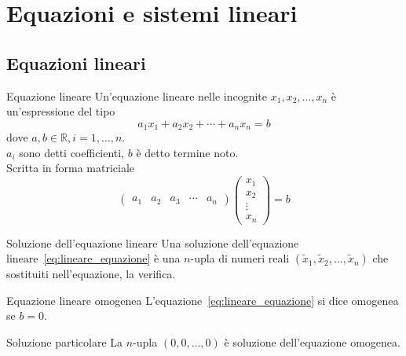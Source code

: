 
\section{Equazioni e sistemi lineari}%
\label{sec:equazioni_e_sistemi_lineari}

\subsection{Equazioni lineari}%
\label{sub:equazioni_lineari}

\begin{Def}{Equazione lineare}
  Un'equazione lineare nelle incognite $x_1,x_2,\ldots,x_n$ è un'espressione del tipo
  \begin{equation}\label{eq:lineare_equazione}
    a_1x_1+a_2x_2+\cdots+a_n x_n=b
  \end{equation}
  dove $a,b\in\mathbb{R}, i=1,\ldots,n$.\\
  $a_i$ sono detti coefficienti, $b$ è detto termine noto.\\
  Scritta in forma matriciale
  \begin{equation*}
    \begin{pmatrix}
      a_1&a_2&a_3&\cdots&a_n
    \end{pmatrix}
    \begin{pmatrix}
      x_1\\x_2\\\vdots\\x_n
    \end{pmatrix}
    = b
  \end{equation*}
\end{Def}

\begin{Def}{Soluzione dell'equazione lineare}
  Una soluzione dell'equazione lineare~\eqref{eq:lineare_equazione} è una $n$-upla di
  numeri reali
  $(\tilde{x}_1,\tilde{x}_2,\ldots,\tilde{x}_n)$ che sostituiti
  nell'equazione, la verifica.
\end{Def}

\begin{Def}{Equazione lineare omogenea}
  L'equazione~\eqref{eq:lineare_equazione} si dice omogenea se $b=0$.
\end{Def}

\begin{SubDef}{Soluzione particolare}
  La $n$-upla $(0,0,\ldots,0)$ è soluzione dell'equazione omogenea.
\end{SubDef}

